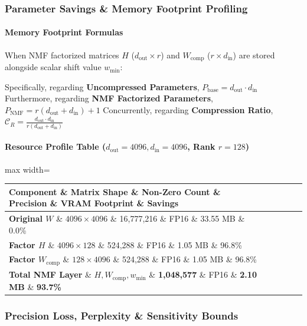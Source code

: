 \subsubsection*{Parameter Savings \& Memory Footprint Profiling}

\paragraph{Memory Footprint Formulas}
When NMF factorized matrices $H$ ($d_{\text{out}} \times r$) and $W_{\text{comp}}$ ($r \times d_{\text{in}}$) are stored alongside scalar shift value $w_{\min}$:

Specifically, regarding \textbf{Uncompressed Parameters}, $P_{\text{base}} = d_{\text{out}} \cdot d_{\text{in}}$ Furthermore, regarding \textbf{NMF Factorized Parameters}, $P_{\text{NMF}} = r(d_{\text{out}} + d_{\text{in}}) + 1$ Concurrently, regarding \textbf{Compression Ratio}, $\mathcal{C}_R = \frac{d_{\text{out}} \cdot d_{\text{in}}}{r(d_{\text{out}} + d_{\text{in}})}$


\paragraph{Resource Profile Table ($d_{\text{out}}=4096, d_{\text{in}}=4096$, Rank $r=128$)}

\begin{center}
\begin{adjustbox}{max width=\columnwidth}
\renewcommand{\arraystretch}{1.2}
\begin{tabular}{llllll}
\toprule
Component \& Matrix Shape \& Non-Zero Count \& Precision \& VRAM Footprint \& Savings \\
\midrule
\textbf{Original $W$} \& $4096 \times 4096$ \& 16,777,216 \& FP16 \& 33.55 MB \& 0.0\% \\
\textbf{Factor $H$} \& $4096 \times 128$ \& 524,288 \& FP16 \& 1.05 MB \& 96.8\% \\
\textbf{Factor $W_{\text{comp}}$} \& $128 \times 4096$ \& 524,288 \& FP16 \& 1.05 MB \& 96.8\% \\
\textbf{Total NMF Layer} \& $H, W_{\text{comp}}, w_{\min}$ \& \textbf{1,048,577} \& FP16 \& \textbf{2.10 MB} \& \textbf{93.7\%} \\

\bottomrule
\end{tabular}
\end{adjustbox}
\end{center}

\subsubsection*{Precision Loss, Perplexity \& Sensitivity Bounds}

